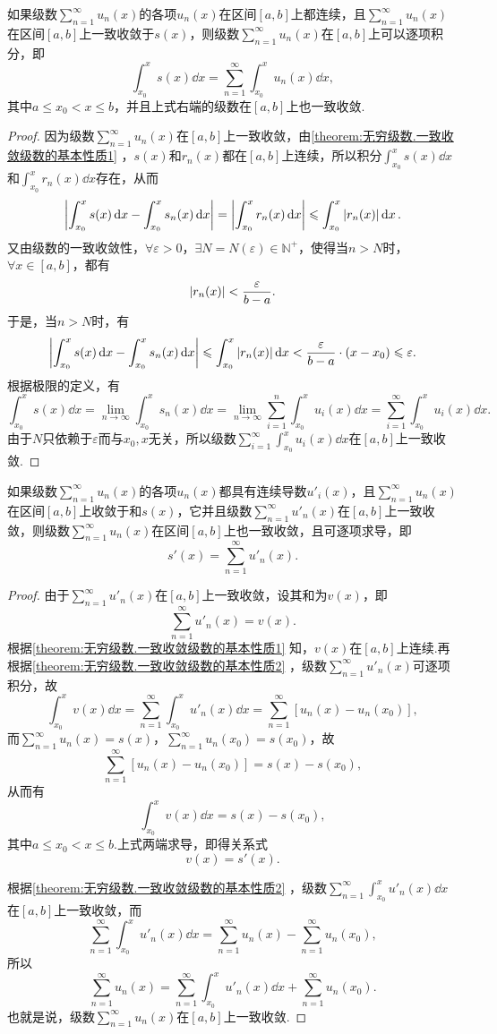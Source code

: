 \begin{property}\label{theorem:无穷级数.一致收敛级数的基本性质2}
\def\s{\sum\limits_{n=1}^{\infty}}
如果级数\(\s u_n(x)\)的各项\(u_n(x)\)在区间\([a,b]\)上都连续，且\(\s u_n(x)\)在区间\([a,b]\)上一致收敛于\(s(x)\)，则级数\(\s u_n(x)\)在\([a,b]\)上可以逐项积分，即\[
\int_{x_0}^x s(x) \dd{x}
= \s \int_{x_0}^x u_n(x) \dd{x},
\]其中\(a \leqslant x_0 < x \leqslant b\)，并且上式右端的级数在\([a,b]\)上也一致收敛.
\begin{proof}
因为级数\(\s u_n(x)\)在\([a,b]\)上一致收敛，由\cref{theorem:无穷级数.一致收敛级数的基本性质1} ，\(s(x)\)和\(r_n(x)\)都在\([a,b]\)上连续，所以积分\(\int_{x_0}^x s(x) \dd{x}\)和\(\int_{x_0}^x r_n(x) \dd{x}\)存在，从而\[
\abs{\int_{x_0}^x s(x) \dd{x} - \int_{x_0}^x s_n(x) \dd{x}}
= \abs{\int_{x_0}^x r_n(x) \dd{x}}
\leqslant \int_{x_0}^x \abs{r_n(x)} \dd{x}.
\]又由级数的一致收敛性，\(\forall\varepsilon>0\)，\(\exists N = N(\varepsilon) \in \mathbb{N}^+\)，使得当\(n > N\)时，\(\forall x \in [a,b]\)，都有\[
\abs{r_n(x)} < \frac{\varepsilon}{b-a}.
\]于是，当\(n > N\)时，有\[
\abs{\int_{x_0}^x s(x) \dd{x} - \int_{x_0}^x s_n(x) \dd{x}}
\leqslant \int_{x_0}^x \abs{r_n(x)} \dd{x}
< \frac{\varepsilon}{b-a} \cdot (x-x_0)
\leqslant \varepsilon.
\]根据极限的定义，有\[
\int_{x_0}^x s(x) \dd{x}
= \lim\limits_{n\to\infty} \int_{x_0}^x s_n(x) \dd{x}
= \lim\limits_{n\to\infty} \sum\limits_{i=1}^n \int_{x_0}^x u_i(x) \dd{x}
= \sum\limits_{i=1}^{\infty} \int_{x_0}^x u_i(x) \dd{x}.
\]由于\(N\)只依赖于\(\varepsilon\)而与\(x_0,x\)无关，所以级数\(\sum\limits_{i=1}^{\infty} \int_{x_0}^x u_i(x) \dd{x}\)在\([a,b]\)上一致收敛.
\end{proof}
\end{property}

\begin{property}\label{theorem:无穷级数.一致收敛级数的基本性质3}
\def\s{\sum\limits_{n=1}^{\infty}}
如果级数\(\s u_n(x)\)的各项\(u_n(x)\)都具有连续导数\(u'_i(x)\)，且\(\s u_n(x)\)在区间\([a,b]\)上收敛于和\(s(x)\)，它并且级数\(\s u'_n(x)\)在\([a,b]\)上一致收敛，则级数\(\s u_n(x)\)在区间\([a,b]\)上也一致收敛，且可逐项求导，即\[
s'(x) = \s u'_n(x).
\]
\begin{proof}
由于\(\s u'_n(x)\)在\([a,b]\)上一致收敛，设其和为\(v(x)\)，即\[
\s u'_n(x) = v(x).
\]根据\cref{theorem:无穷级数.一致收敛级数的基本性质1} 知，\(v(x)\)在\([a,b]\)上连续.再根据\cref{theorem:无穷级数.一致收敛级数的基本性质2} ，级数\(\s u'_n(x)\)可逐项积分，故\[
\int_{x_0}^x v(x) \dd{x}
= \s \int_{x_0}^x u'_n(x) \dd{x}
= \s [u_n(x) - u_n(x_0)],
\]而\(\s u_n(x) = s(x)\)，\(\s u_n(x_0) = s(x_0)\)，故\[
\s [u_n(x) - u_n(x_0)] = s(x) - s(x_0),
\]从而有\[
\int_{x_0}^x v(x) \dd{x} = s(x) - s(x_0),
\]其中\(a \leqslant x_0 < x \leqslant b\).上式两端求导，即得关系式\[
v(x) = s'(x).
\]

根据\cref{theorem:无穷级数.一致收敛级数的基本性质2} ，级数\(\s \int_{x_0}^x u'_n(x) \dd{x}\)在\([a,b]\)上一致收敛，而\[
\s \int_{x_0}^x u'_n(x) \dd{x} = \s u_n(x) - \s u_n(x_0),
\]所以\[
\s u_n(x) = \s \int_{x_0}^x u'_n(x) \dd{x} + \s u_n(x_0).
\]也就是说，级数\(\s u_n(x)\)在\([a,b]\)上一致收敛.
\end{proof}
\end{property}

